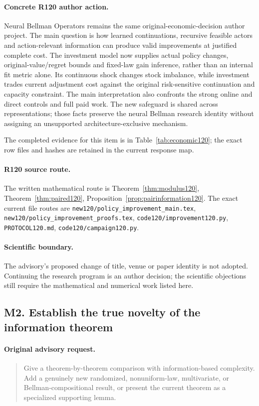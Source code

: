 \paragraph{Concrete R120 author action.}
Neural Bellman Operators remains the same original-economic-decision author project. The main question is how learned continuations, recursive feasible actors and action-relevant information can produce valid improvements at justified complete cost. The investment model now supplies actual policy changes, original-value/regret bounds and fixed-law gain inference, rather than an internal fit metric alone. Its continuous shock changes stock imbalance, while investment trades current adjustment cost against the original risk-sensitive continuation and capacity constraint. The main interpretation also confronts the strong online and direct controls and full paid work. The new safeguard is shared across representations; those facts preserve the neural Bellman research identity without assigning an unsupported architecture-exclusive mechanism.

The completed evidence for this item is in Table~\ref{tab:economic120}; the exact row files and hashes are retained in the current response map.
\paragraph{R120 source route.}
The written mathematical route is Theorem~\ref{thm:modulus120}, Theorem~\ref{thm:paired120}, Proposition~\ref{prop:pairinformation120}. The exact current file routes are \nolinkurl{new120/policy_improvement_main.tex}, \nolinkurl{new120/policy_improvement_proofs.tex}, \nolinkurl{code120/improvement120.py}, \nolinkurl{PROTOCOL120.md}, \nolinkurl{code120/campaign120.py}.
\paragraph{Scientific boundary.}
The advisory's proposed change of title, venue or paper identity is not adopted. Continuing the research program is an author decision; the scientific objections still require the mathematical and numerical work listed here.

\subsection{M2. Establish the true novelty of the information theorem}
\label{response120:M2}
\paragraph{Original advisory request.}
\begin{quote}
Give a theorem-by-theorem comparison with information-based complexity. Add a genuinely new randomized, nonuniform-law, multivariate, or Bellman-compositional result, or present the current theorem as a specialized supporting lemma.
\end{quote}
